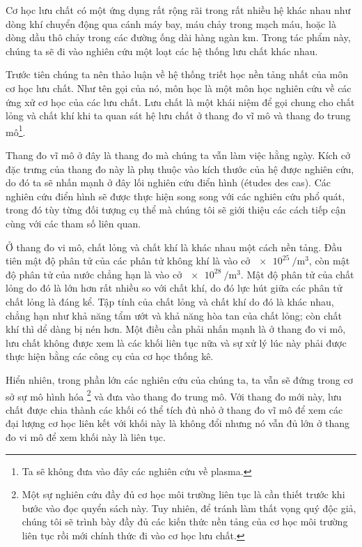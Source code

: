 \documentclass[../../../main.tex]{subfiles}
\begin{document}
    Cơ học lưu chất có một ứng dụng rất rộng rãi trong rất nhiều hệ khác nhau như dòng khí chuyển động qua cánh máy bay, máu chảy trong mạch máu, hoặc là dòng dầu thô chảy trong các đường ống dài hàng ngàn km. Trong tác phẩm này, chúng ta sẽ đi vào nghiên cứu một loạt các hệ thống lưu chất khác nhau.
        
    Trước tiên chúng ta nên thảo luận về hệ thống triết học nền tảng nhất của môn cơ học lưu chất. Như tên gọi của nó, môn học  là một môn học nghiên cứu về các ứng xử cơ học của các lưu chất. Lưu chất là một khái niệm để gọi chung cho chất lỏng và chất khí khi ta quan sát hệ lưu chất ở thang đo vĩ mô và thang đo trung mô\footnote{Ta sẽ không đưa vào đây các nghiên cứu về plasma.}.

    Thang đo vĩ mô ở đây là thang đo mà chúng ta vẫn làm việc hằng ngày. Kích cở đặc trưng của thang đo này là phụ thuộc vào kích thước của hệ được nghiên cứu, do đó ta sẽ nhấn mạnh ở đây lối nghiên cứu điển hình (études des cas). Các nghiên cứu điển hình sẽ được thực hiện song song với các nghiên cứu phổ quát, trong đó tùy từng đối tượng cụ thể mà chúng tôi sẽ giới thiệu các cách tiếp cận cùng với các tham số liên quan.

    Ở thang đo vi mô, chất lỏng và chất khí là khác nhau một cách nền tảng. Đầu tiên mật độ phân tử của các phân tử không khí là vào cở $\SI{e25}{\per\metre\cubed}$, còn mật độ phân tử của nước chẳng hạn là vào cở $\SI{e28}{\per\metre\cubed}$. Mật độ phân tử của chất lỏng do đó là lớn hơn rất nhiều so với chất khí, do đó lực hút giữa các phân tử chất lỏng là đáng kể. Tập tính của chất lỏng và chất khí do đó là khác nhau, chẳng hạn như khả năng tẩm ướt và khả năng hòa tan của chất lỏng; còn chất khí thì dể dàng bị nén hơn. Một điều cần phải nhấn mạnh là ở thang đo vi mô, lưu chất không được xem là các khối liên tục nữa và sự xử lý lúc này phải được thực hiện bằng các công cụ của cơ học thống kê.

    Hiển nhiên, trong phần lớn các nghiên cứu của chúng ta, ta vẫn sẽ đứng trong cơ sở sự mô hình hóa \footnote{Một sự nghiên cứu đầy đủ cơ học môi trường liên tục là cần thiết trước khi bước vào đọc quyển sách này. Tuy nhiên, để tránh làm thất vọng quý độc giả, chúng tôi sẽ trình bày đầy đủ các kiến thức nền tảng của cơ học môi trường liên tục rồi mới chính thức đi vào cơ học lưu chất.} và đưa vào thang đo trung mô. Với thang đo mới này, lưu chất được chia thành các khối có thể tích đủ nhỏ ở thang đo vĩ mô để xem các đại lượng cơ học liên kết với khối này là không đổi nhưng nó vẫn đủ lớn ở thang đo vi mô để xem khối này là liên tục.
        
\end{document}
